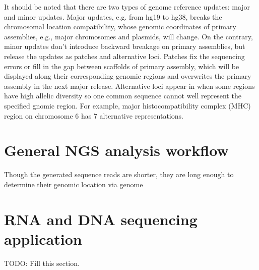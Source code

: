 
It should be noted that there are two types of genome reference updates: major
and minor updates. Major updates, e.g. from hg19 to hg38, breaks the
chromosomal location compatibility, whose genomic coordinates of primary
assemblies, e.g., major chromosomes and plasmids, will change. On the contrary,
minor updates don't introduce backward breakage on primary assemblies, but
release the updates as patches and alternative loci. Patches fix the sequencing
errors or fill in the gap between scaffolds of primary assembly, which will be
displayed along their corresponding genomic regions and overwrites the primary
assembly in the next major release. Alternative loci appear in when some
regions have high allelic diversity so one common sequence cannot well
represent the specified gnomic region. For example, major histocompatibility
complex (MHC) region on chromosome 6 has 7 alternative representations.


%
%

\section{General NGS analysis workflow}



Though the generated sequence reads are shorter, they are long enough to
determine their genomic location via genome


\section{RNA and DNA sequencing application}
\label{s:rna-dna-seq-app}


TODO: Fill this section.


